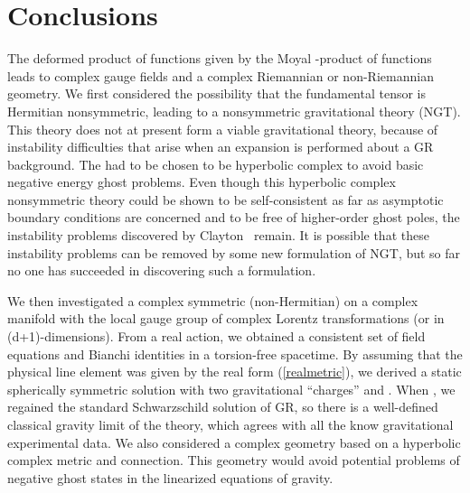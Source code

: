 \documentclass[a4paper,10pt]{article}
\begin{document}
\section{Conclusions}

The deformed product of functions given by the
Moyal \myHighlight{$\star$}\coordHE{}-product of functions leads to complex gauge fields and a
complex Riemannian or non-Riemannian geometry. We first considered the
possibility that the fundamental tensor \coordHE{} is Hermitian
nonsymmetric, leading to a nonsymmetric gravitational theory (NGT). This
theory does not at present form a viable gravitational theory, because of
instability difficulties that arise when an expansion is performed about a
GR background. The \coordHE{} had to be chosen to be hyperbolic
complex to avoid basic negative energy ghost problems. Even though this
hyperbolic complex nonsymmetric theory could be shown to be self-consistent
as far as asymptotic boundary conditions are concerned and to be free of
higher-order ghost poles, the instability problems discovered by
Clayton~\cite{Clayton,Clayton2} remain. It is possible that these
instability problems can be removed by some new formulation of
NGT, but so far no one has succeeded in discovering such a
formulation.

We then investigated a complex symmetric (non-Hermitian) \coordHE{}
on a complex manifold with the local gauge group of complex
Lorentz transformations \coordHE{} (or \coordHE{} in
(d+1)-dimensions). From a real action, we obtained a consistent set of
field equations and Bianchi identities in a torsion-free spacetime. By
assuming that the physical line element was given by the real form
(\ref{realmetric}), we derived a static spherically symmetric solution
with two gravitational ``charges'' \coordHE{} and \myHighlight{$2\epsilon$}\coordHE{}. When \coordHE{},
we regained the standard Schwarzschild solution of GR, so there is a
well-defined classical gravity limit of the theory, which agrees with all
the know gravitational experimental data. We also considered a complex
geometry based on a hyperbolic complex metric and connection. This geometry
would avoid potential problems of negative ghost states in the linearized
equations of gravity.
\end{document}

